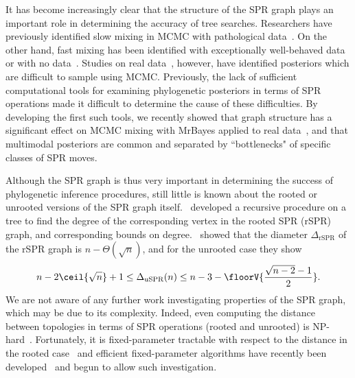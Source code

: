 \documentclass[10pt,twoside,leqno,twocolumn]{article}
\begin{document}
It has become increasingly clear that the structure of the SPR graph plays an important role in determining the accuracy of tree searches.
Researchers have previously identified slow mixing in MCMC with pathological data~\cite{Mossel2005-ly,Mossel2006-fo,Ronquist2006-fv}.
On the other hand, fast mixing has been identified with exceptionally well-behaved data~\cite{Stefankovic2011-hu} or with no data~\cite{spade2014note}.
Studies on real data~\cite{beiko2006searching, lakner2008efficiency}, however, have identified posteriors which are difficult to sample using MCMC.
Previously, the lack of sufficient computational tools for examining phylogenetic posteriors in terms of SPR operations made it difficult to determine the cause of these difficulties.
By developing the first such tools, we recently showed that graph structure has a significant effect on MCMC mixing with MrBayes applied to real data~\cite{Whidden2015-yi}, and that multimodal posteriors are common and separated by ``bottlenecks" of specific classes of SPR moves.

Although the SPR graph is thus very important in determining the success of phylogenetic inference procedures, still little is known about the rooted or unrooted versions of the SPR graph itself.
\cite{Song2003-gf}~developed a recursive procedure on a tree to find the degree of the corresponding vertex in the rooted SPR (rSPR) graph, and corresponding bounds on degree.
\cite{Ding2011-bj}~showed that the diameter $\Delta_{\text{rSPR}}$ of the rSPR graph is $n - \Theta(\sqrt n)$, and for the unrooted case they show
\begin{equation}
n - 2\ceil{\sqrt{n}} + 1
\le \Delta_{\text{uSPR}}(n)
\le n - 3 - \floorV{\frac{\sqrt{n - 2} - 1}{2}}.
\end{equation}
We are not aware of any further work investigating properties of the SPR graph, which may be due to its complexity.
Indeed, even computing the distance between topologies in terms of SPR operations (rooted and unrooted) is NP-hard~\cite{bordewich05,hickey2008sdc}.
Fortunately, it is fixed-parameter tractable with respect to the distance in the rooted case~\cite{bordewich05} and efficient fixed-parameter algorithms have recently been developed~\cite{whidden2013hybridization,Whidden2015-yi} and begun to allow such investigation.
\end{document}
